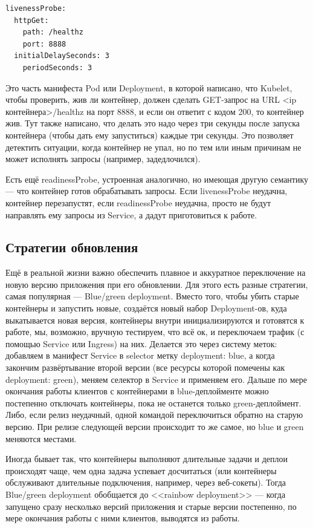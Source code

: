 \documentclass[a5paper]{article}
\begin{document}
\begin{verbatim}
livenessProbe:
  httpGet:
    path: /healthz
    port: 8888
  initialDelaySeconds: 3
    periodSeconds: 3
\end{verbatim}

Это часть манифеста Pod или Deployment, в которой написано, что Kubelet, чтобы проверить, жив ли контейнер, должен сделать GET-запрос на URL <ip контейнера>/healthz на порт 8888, и если он ответит с кодом 200, то контейнер жив. Тут также написано, что делать это надо через три секунды после запуска контейнера (чтобы дать ему запуститься) каждые три секунды. Это позволяет детектить ситуации, когда контейнер не упал, но по тем или иным причинам не может исполнять запросы (например, задедлочился).

Есть ещё readinessProbe, устроенная аналогично, но имеющая другую семантику --- что контейнер готов обрабатывать запросы. Если livenessProbe неудачна, контейнер перезапустят, если readinessProbe неудачна, просто не будут направлять ему запросы из Service, а дадут приготовиться к работе.

\subsection{Стратегии обновления}

Ещё в реальной жизни важно обеспечить плавное и аккуратное переключение на новую версию приложения при его обновлении. Для этого есть разные стратегии, самая популярная --- Blue/green deployment. Вместо того, чтобы убить старые контейнеры и запустить новые, создаётся новый набор Deployment-ов, куда выкатывается новая версия, контейнеры внутри инициализируются и готовятся к работе, мы, возможно, вручную тестируем, что всё ок, и переключаем трафик (с помощью Service или Ingress) на них. Делается это через систему меток: добавляем в манифест Service в selector метку deployment: blue, а когда закончим развёртывание второй версии (все ресурсы которой помечены как deployment: green), меняем селектор в Service и применяем его. Дальше по мере окончания работы клиентов с контейнерами в blue-деплойменте можно постепенно отключать контейнеры, пока не останется только green-деплоймент. Либо, если релиз неудачный, одной командой переключиться обратно на старую версию. При релизе следующей версии происходит то же самое, но blue и green меняются местами.

Иногда бывает так, что контейнеры выполняют длительные задачи и деплои происходят чаще, чем одна задача успевает досчитаться (или контейнеры обслуживают длительные подключения, например, через веб-сокеты). Тогда Blue/green deployment обобщается до <<rainbow deployment>> --- когда запущено сразу несколько версий приложения и старые версии постепенно, по мере окончания работы с ними клиентов, выводятся из работы.
\end{document}

